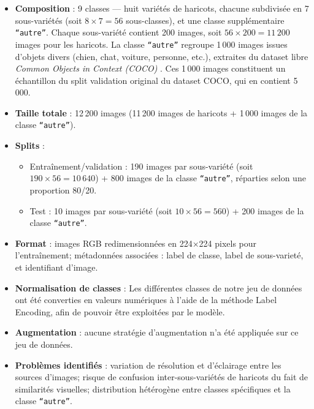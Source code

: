 \begin{itemize}
	\item \textbf{Composition} : 9 classes — huit variétés de haricots, chacune subdivisée en 7 sous-variétés (soit \(8 \times 7 = 56\) sous-classes), et une classe supplémentaire \texttt{``autre''}. Chaque sous-variété contient 200 images, soit \(56 \times 200 = 11\,200\) images pour les haricots. La classe \texttt{``autre''} regroupe 1\,000 images issues d’objets divers (chien, chat, voiture, personne, etc.), extraites du dataset libre \emph{Common Objects in Context (COCO)} \cite{lin2014microsoft}. Ces 1\,000 images constituent un échantillon du split validation original du dataset COCO, qui en contient 5\,000.
	\item \textbf{Taille totale} : 12\,200 images (11\,200 images de haricots + 1\,000 images de la classe \texttt{``autre''}).
	\item \textbf{Splits} :
	      \begin{itemize}
		      \item Entraînement/validation : 190 images par sous-variété (soit \(190 \times 56 = 10\,640\)) + 800 images de la classe \texttt{``autre''}, réparties selon une proportion 80/20.
		      \item Test : 10 images par sous-variété (soit \(10 \times 56 = 560\)) + 200 images de la classe \texttt{``autre''}.
	      \end{itemize}
	\item \textbf{Format} : images RGB redimensionnées en 224×224 pixels pour l’entraînement; métadonnées associées : label de classe, label de sous-varieté, et identifiant d’image.
	\item \textbf{Normalisation de classes} : Les différentes classes de notre jeu de données ont été converties en valeurs numériques à l’aide de la méthode Label Encoding, afin de pouvoir être exploitées par le modèle.
	\item \textbf{Augmentation} : aucune stratégie d’augmentation n’a été appliquée sur ce jeu de données.
	\item \textbf{Problèmes identifiés} : variation de résolution et d’éclairage entre les sources d’images; risque de confusion inter-sous-variétés de haricots du fait de similarités visuelles; distribution hétérogène entre classes spécifiques et la classe \texttt{``autre''}.
\end{itemize}

